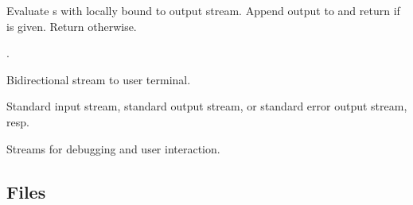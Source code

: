 \begin{LIST}{1cm}
  Evaluate s with  locally bound to output
  stream. Append output to  and return  if  is given. Return  otherwise. 

  .

  Bidirectional stream to user terminal.

  Standard input stream, standard output stream, 
  or standard error output stream, resp.

  Streams for debugging and user interaction.

\end{LIST}


\subsection{Files} 

